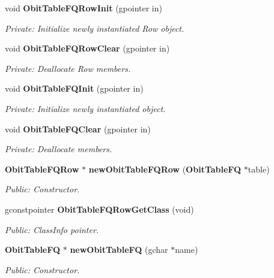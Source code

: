 \begin{CompactItemize}
\item 
void {\bf Obit\-Table\-FQRow\-Init} (gpointer in)
\begin{CompactList}\small\item\em Private: Initialize newly instantiated Row object. \item\end{CompactList}\item 
void {\bf Obit\-Table\-FQRow\-Clear} (gpointer in)
\begin{CompactList}\small\item\em Private: Deallocate Row members. \item\end{CompactList}\item 
void {\bf Obit\-Table\-FQInit} (gpointer in)
\begin{CompactList}\small\item\em Private: Initialize newly instantiated object. \item\end{CompactList}\item 
void {\bf Obit\-Table\-FQClear} (gpointer in)
\begin{CompactList}\small\item\em Private: Deallocate members. \item\end{CompactList}\item 
{\bf Obit\-Table\-FQRow} $\ast$ {\bf new\-Obit\-Table\-FQRow} ({\bf Obit\-Table\-FQ} $\ast$table)
\begin{CompactList}\small\item\em Public: Constructor. \item\end{CompactList}\item 
gconstpointer {\bf Obit\-Table\-FQRow\-Get\-Class} (void)
\begin{CompactList}\small\item\em Public: Class\-Info pointer. \item\end{CompactList}\item 
{\bf Obit\-Table\-FQ} $\ast$ {\bf new\-Obit\-Table\-FQ} (gchar $\ast$name)
\begin{CompactList}\small\item\em Public: Constructor. \item\end{CompactList}\item 

\end{CompactItemize}
